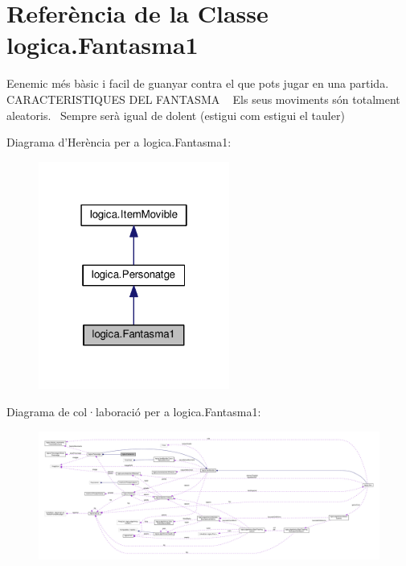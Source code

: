 \hypertarget{classlogica_1_1_fantasma1}{\section{Referència de la Classe logica.\+Fantasma1}
\label{classlogica_1_1_fantasma1}
}


Eenemic més bàsic i facil de guanyar contra el que pots jugar en una partida.~\newline
~\newline
C\+A\+R\+A\+C\+T\+E\+R\+I\+S\+T\+I\+Q\+U\+E\+S D\+E\+L F\+A\+N\+T\+A\+S\+M\+A ~\newline
Els seus moviments són totalment aleatoris.~\newline
Sempre serà igual de dolent (estigui com estigui el tauler)  




Diagrama d'Herència per a logica.\+Fantasma1\+:
\nopagebreak
\begin{figure}[H]
\begin{center}
\leavevmode
\includegraphics[width=178pt]{classlogica_1_1_fantasma1__inherit__graph}
\end{center}
\end{figure}


Diagrama de col·laboració per a logica.\+Fantasma1\+:
\nopagebreak
\begin{figure}[H]
\begin{center}
\leavevmode
\includegraphics[width=350pt]{classlogica_1_1_fantasma1__coll__graph}
\end{center}
\end{figure}
